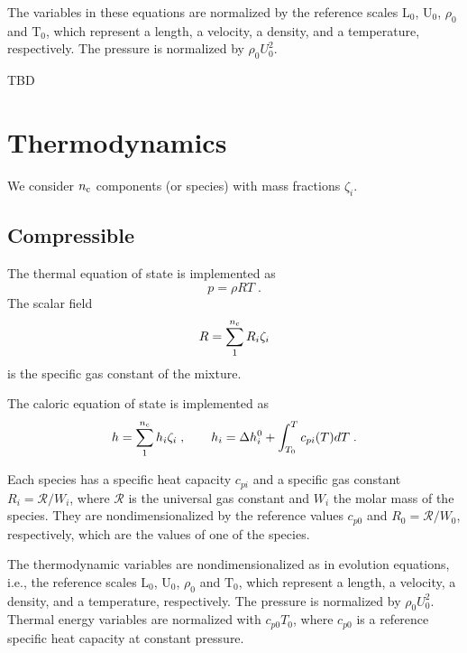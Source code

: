 The variables in these equations are normalized by the reference scales $\mathrm{L}_0$, $\mathrm{U}_0$, $\rho_0$ and $\mathrm{T}_0$, which represent a length, a velocity, a density, and a temperature, respectively. The pressure is normalized by $\rho_0U_0^2$. 

TBD

\section{Thermodynamics}

We consider $n\sc$ components (or species) with mass fractions $\zeta_i$.

\subsection{Compressible}
The thermal equation of state is implemented as
\begin{equation}
    p = \rho R T \;.
\end{equation}
The scalar field 
\begin{equation}
    R =\sum^{n\sc}_1 R_i\zeta_i
\end{equation}
is the specific gas constant of the mixture.

The caloric equation of state is implemented as
\begin{equation}
    h = \sum^{n\sc}_1 h_{i} \zeta_i \;,\qquad h_{i} = \Delta h^0_i + \int^{T}_{T_0}
    c_{pi}(T) dT \;.
\end{equation}

Each species has a specific heat capacity $c_{pi}$ and a specific gas constant $R_i=\mathcal{R}/W_i$,  where  $\mathcal{R}$ is the universal gas constant and $W_i$ the molar mass of the species. They are nondimensionalized by the reference values $c_{p0}$ and $R_0=\mathcal{R}/W_0$, respectively, which are the values of one of the species. %

The thermodynamic variables are nondimensionalized as in evolution equations, i.e., the reference scales $\mathrm{L}_0$, $\mathrm{U}_0$, $\rho_0$ and $\mathrm{T}_0$, which represent a length, a velocity, a density, and a temperature, respectively. The pressure is normalized by $\rho_0U_0^2$. Thermal energy variables are normalized with $c_{p0}T_0$, where $c_{p0}$ is a reference specific heat capacity at constant pressure.

